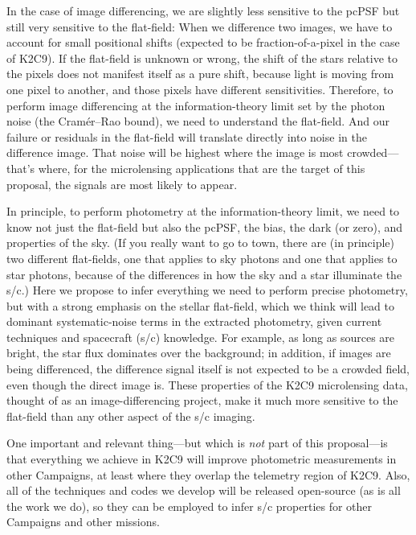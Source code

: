 \documentclass[12pt,preprint]{aastex}
\begin{document}
In the case of image differencing, we are slightly less sensitive to the
pcPSF but still very sensitive to the flat-field:
When we difference two images, we have to account for small positional
shifts (expected to be fraction-of-a-pixel in the case of K2C9).
If the flat-field is unknown or wrong, the shift of the stars relative
to the pixels does not manifest itself as a pure shift, because light
is moving from one pixel to another, and those pixels have different
sensitivities.
Therefore, to perform image differencing at the information-theory
limit set by the photon noise (the Cram\'er--Rao bound), we need to
understand the flat-field.
And our failure or residuals in the flat-field will translate directly
into noise in the difference image.
That noise will be highest where the image is most crowded---that's where, for
the microlensing applications that are the target of this proposal,
the signals are most likely to appear.

In principle, to perform photometry at the information-theory limit,
we need to know not just the flat-field but also the pcPSF, the bias,
the dark (or zero), and properties of the sky.
(If you really want to go to town, there are (in principle) two different
flat-fields, one that applies to sky photons and one that applies to star photons,
because of the differences in how the sky and a star illuminate the
s/c.)
Here we propose to infer everything we need to perform precise
photometry, but with a strong emphasis on the stellar flat-field, which we
think will lead to dominant systematic-noise terms in the extracted
photometry, given current techniques and spacecraft (s/c) knowledge.
For example, as long as sources are bright, the star flux dominates
over the background; in addition, if images are being differenced, the
difference signal itself is not expected to be a crowded field, even though
the direct image is.
These properties of the K2C9 microlensing data, thought of as an
image-differencing project, make it much more sensitive to the flat-field than
any other aspect of the s/c imaging.

One important and relevant thing---but which is \emph{not} part of this
proposal---is that everything we achieve in K2C9 will improve photometric
measurements in other Campaigns, at least where they overlap the
telemetry region of K2C9.
Also, all of the techniques and codes we develop will be released
open-source (as is all the work we do), so they can be employed to
infer s/c properties for other Campaigns and other missions.
\end{document}
